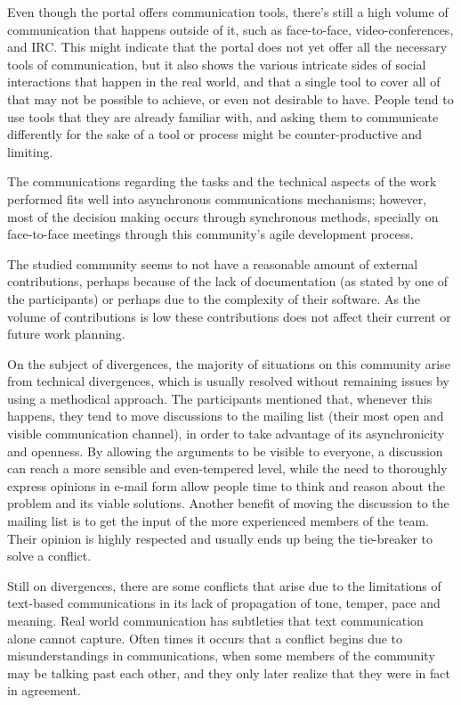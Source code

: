 \documentclass{sigchi}
\begin{document}
Even though the portal offers communication tools, there's still a high volume of communication that happens outside of it, such as face-to-face, video-conferences, and IRC. This might indicate that the portal does not yet offer all the necessary tools of communication, but it also shows the various intricate sides of social interactions that happen in the real world, and that a single tool to cover all of that may not be possible to achieve, or even not desirable to have. People tend to use tools that they are already familiar with, and asking them to communicate differently for the sake of a tool or process might be counter-productive and limiting.

The communications regarding the tasks and the technical aspects of the work performed fits well into asynchronous communications mechanisms; however, most of the decision making occurs through synchronous methods, specially on face-to-face meetings through this community's agile development process. 

The studied community seems to not have a reasonable amount of external contributions, perhaps because of the lack of documentation (as stated by one of the participants) or perhaps due to the complexity of their software. As the volume of contributions is low these contributions does not affect their current or future work planning.

On the subject of divergences, the majority of situations on this community arise from technical divergences, which is usually resolved without remaining issues by using a methodical approach. The participants mentioned that, whenever this happens, they tend to move discussions to the mailing list (their most open and visible communication channel), in order to take advantage of its asynchronicity and openness. By allowing the arguments to be visible to everyone, a discussion can reach a more sensible and even-tempered level, while the need to thoroughly express opinions in e-mail form allow people time to think and reason about the problem and its viable solutions. Another benefit of moving the discussion to the mailing list is to get the input of the more experienced members of the team. Their opinion is highly respected and usually ends up being the tie-breaker to solve a conflict.

Still on divergences, there are some conflicts that arise due to the limitations of text-based communications in its lack of propagation of tone, temper, pace and meaning. Real world communication has subtleties that text communication alone cannot capture. Often times it occurs that a conflict begins due to misunderstandings in communications, when some members of the community may be talking past each other, and they only later realize that they were in fact in agreement.
\end{document}
